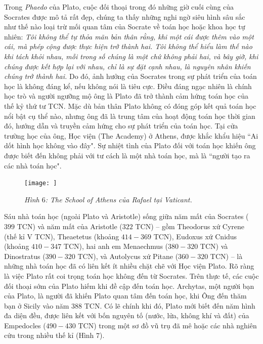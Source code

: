 \begin{multicols}{2}
	\vskip 0.1cm
	Trong \textit{Phaedo} của Plato, cuộc đối thoại trong đó những giờ cuối cùng của Socrates được mô tả rất đẹp, chúng ta thấy những nghi ngờ siêu hình sâu sắc như thế nào loại trừ mối quan tâm của Socrate về toán học hoặc khoa học tự nhiên:
	\vskip 0.1cm
	\textit{Tôi không thể tự thỏa mãn bản thân rằng, khi một cái được thêm vào một cái, mà phép cộng được thực hiện trở thành hai. 
	\vskip 0.1cm
	Tôi không thể hiểu làm thế nào khi tách khỏi nhau, mỗi trong số chúng là một chứ không phải hai, và bây giờ, khi chúng được kết hợp lại với nhau, chỉ là sự đặt cạnh nhau, là nguyên nhân khiến chúng trở thành hai.}
	\vskip 0.1cm
	Do đó, ảnh hưởng của Socrates trong sự phát triển của toán học là không đáng kể, nếu không nói là tiêu cực. Điều đáng ngạc nhiên là chính học trò và người ngưỡng mộ ông là Plato đã trở thành cảm hứng toán học của thế kỷ thứ tư TCN. 
	\vskip 0.1cm
	Mặc dù bản thân Plato không có đóng góp kết quả toán học nổi bật cụ thể nào, nhưng ông đã là trung tâm của hoạt động toán học thời gian đó, hướng dẫn và truyền cảm hứng cho sự phát triển của toán học. Tại cửa trường học của ông, Học viện (The Academy) ở Athens, được khắc khẩu hiệu ``Ai dốt hình học không vào đây".
	\vskip 0.1cm
	\vskip 0.1cm
	Sự nhiệt tình của Plato đối với toán học khiến ông được biết đến không phải với tư cách là một nhà toán học, mà là ``người tạo ra các nhà toán học".
	\begin{figure}[H]
		\vspace*{-5pt}
		\centering
		\captionsetup{labelformat= empty, justification=centering}
		\texttt{[image: ]}
		\caption{\small\textit{\color{lichsutoanhoc}Hình $6$: The School of Athens của Rafael tại Vaticant.}}
		\vspace*{-10pt}
	\end{figure}
	Sáu nhà toán học (ngoài Plato và Aristotle) sống giữa năm mất của Socrates ($399$ TCN) và năm mất của Aristotle ($322$ TCN) -- gồm Theodorus xứ Cyrene (thế kỉ V TCN), Theaetetus (khoảng $414-369$ TCN), Eudoxus xứ Cnidus (khoảng $410-347$ TCN), hai anh em Menaechmus ($380-320$ TCN) và Dinostratus ($390-320$  TCN), và Autolycus xứ Pitane ($360-320$ TCN) -- là những nhà toán học đã có liên kết ít nhiều chặt chẽ với Học viện Plato.
	\vskip 0.1cm
	Rõ ràng là việc Plato rất coi trọng toán học không đến từ Socrates. Trên thực tế, các cuộc đối thoại sớm của Plato hiếm khi đề cập đến toán học.  Archytas, một người bạn của Plato, là người đã khiến Plato quan tâm đến toán học, khi Ông đến thăm bạn ở Sicily vào năm 388 TCN. Có lẽ chính khi đó, Plato mới biết đến năm hình đa diện đều, được liên kết với bốn nguyên tố (nước, lửa, không khí và đất) của Empedocles ($490-430$ TCN) trong một sơ đồ vũ trụ đã mê hoặc các nhà nghiên cứu trong nhiều thế kỉ (Hình $7$). 

\end{multicols}
